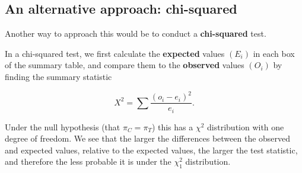 \documentclass[
  openany]{book}
\theoremstyle{definition}
\theoremstyle{definition}
\theoremstyle{definition}
\theoremstyle{definition}
\theoremstyle{remark}
\begin{document}
\subsection{An alternative approach: chi-squared}\label{an-alternative-approach-chi-squared}

Another way to approach this would be to conduct a \textbf{chi-squared} test.

In a chi-squared test, we first calculate the \textbf{expected} values \(\left(E_i\right)\) in each box of the summary table, and compare them to the \textbf{observed} values \(\left(O_i\right)\) by finding the summary statistic

\[ X^2 = \sum \frac{\left(o_i - e_i\right)^2}{e_i}.\]

Under the null hypothesis (that \(\pi_C = \pi_T\)) this has a \(\chi^2\) distribution with one degree of freedom. We see that the larger the differences between the observed and expected values, relative to the expected values, the larger the test statistic, and therefore the less probable it is under the \(\chi^2_1\) distribution.
\end{document}
